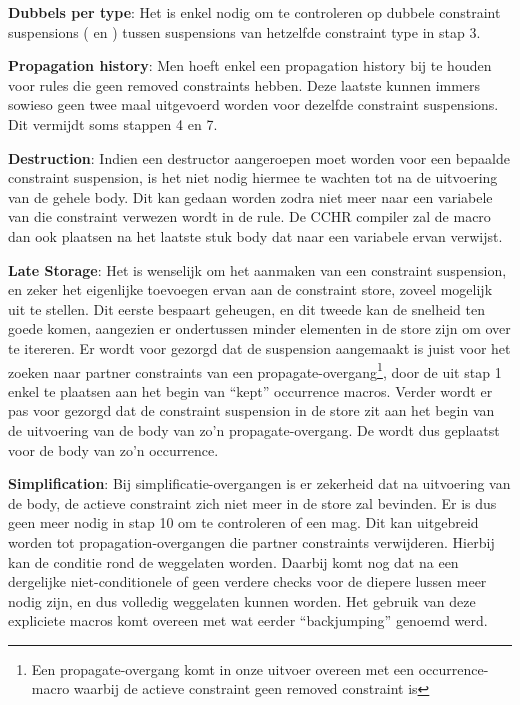 {\bf Dubbels per type}: Het is enkel nodig om te controleren op dubbele constraint suspensions ( en ) tussen suspensions van hetzelfde constraint type in stap 3.

{\bf Propagation history}: Men hoeft enkel een propagation history bij te houden voor rules die geen removed constraints hebben. Deze laatste kunnen immers sowieso geen twee maal uitgevoerd worden voor dezelfde constraint suspensions. Dit vermijdt soms stappen 4 en 7.

{\bf Destruction}: Indien een destructor aangeroepen moet worden voor een bepaalde constraint suspension, is het niet nodig hiermee te wachten tot na de uitvoering van de gehele body. Dit kan gedaan worden zodra niet meer naar een variabele van die constraint verwezen wordt in de rule. De CCHR compiler zal de  macro dan ook plaatsen na het laatste stuk body dat naar een variabele ervan verwijst.

{\bf Late Storage}: Het is wenselijk om het aanmaken van een constraint suspension, en zeker het eigenlijke toevoegen ervan aan de constraint store, zoveel mogelijk uit te stellen. Dit eerste bespaart geheugen, en dit tweede kan de snelheid ten goede komen, aangezien er ondertussen minder elementen in de store zijn om over te itereren. Er wordt voor gezorgd dat de suspension aangemaakt is juist voor het zoeken naar partner constraints van een propagate-overgang\footnote{Een propagate-overgang komt in onze uitvoer overeen met een occurrence-macro waarbij de actieve constraint geen removed constraint is}, door de  uit stap 1 enkel te plaatsen aan het begin van ``kept'' occurrence macros. Verder wordt er pas voor gezorgd dat de constraint suspension in de store zit aan het begin van de uitvoering van de body van zo'n propagate-overgang. De  wordt dus geplaatst voor de body van zo'n occurrence.

{\bf Simplification}: Bij simplificatie-overgangen is er zekerheid dat na uitvoering van de body, de actieve constraint zich niet meer in de store zal bevinden. Er is dus geen  meer nodig in stap 10 om te controleren of een  mag. Dit kan uitgebreid worden tot propagation-overgangen die partner constraints verwijderen. Hierbij kan de  conditie rond de  weggelaten worden. Daarbij komt nog dat na een dergelijke niet-conditionele  of  geen verdere checks voor de diepere lussen meer nodig zijn, en dus volledig weggelaten kunnen worden. Het gebruik van deze expliciete  macros komt overeen met wat eerder ``backjumping'' genoemd werd.


